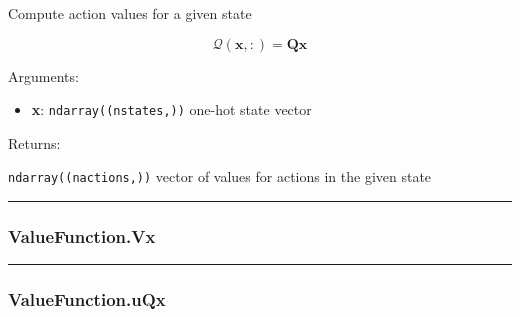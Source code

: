 \begin{Shaded}
\begin{Highlighting}[]
\end{Highlighting}
\end{Shaded}

Compute action values for a given state

\[
\mathcal Q(\mathbf x, :) = \mathbf Q \mathbf x
\]

Arguments:

\begin{itemize}
\tightlist
\item
  \textbf{x}: \texttt{ndarray((nstates,))} one-hot state vector
\end{itemize}

Returns:

\texttt{ndarray((nactions,))} vector of values for actions in the given
state

\begin{center}\rule{0.5\linewidth}{\linethickness}\end{center}

\hypertarget{valuefunction.vx}{%
\subsubsection{ValueFunction.Vx}\label{valuefunction.vx}}

\begin{Shaded}
\begin{Highlighting}[]
\end{Highlighting}
\end{Shaded}

\begin{center}\rule{0.5\linewidth}{\linethickness}\end{center}

\hypertarget{valuefunction.uqx}{%
\subsubsection{ValueFunction.uQx}\label{valuefunction.uqx}}

\begin{Shaded}
\begin{Highlighting}[]
\end{Highlighting}
\end{Shaded}

